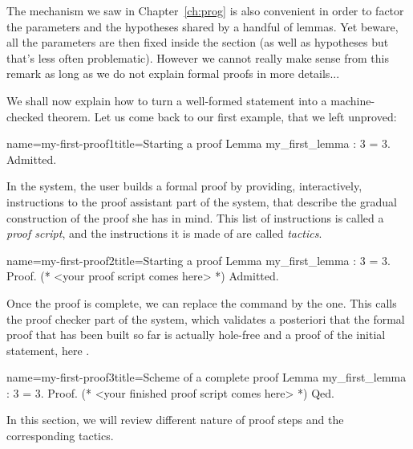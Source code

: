 
The  mechanism we saw in Chapter~\ref{ch:prog} is also
convenient in order to factor the parameters and the hypotheses shared
by a handful of lemmas. Yet beware, all the parameters are then fixed
inside the section (as well as hypotheses but that's less often
problematic). However we cannot really make sense from this remark as
long as we do not explain formal proofs in more details...


We shall now explain how to turn a well-formed statement into a
machine-checked theorem. Let us come back to our first example, that
we left unproved:
\begin{coq}{name=my-first-proof1}{title=Starting a proof}
Lemma my_first_lemma : 3 = 3.
Admitted.
\end{coq}
In the \Coq{} system, the user builds a formal proof by providing,
interactively, instructions to the proof assistant part of the \Coq{}
system, that describe the gradual construction of the proof she has in
mind. This list of instructions is called a \emph{proof script}, and
the instructions it is made of are called \emph{tactics}.

\begin{coq}{name=my-first-proof2}{title=Starting a proof}
Lemma my_first_lemma : 3 = 3.
Proof.
(* <your proof script comes here> *)
Admitted.
\end{coq}

Once the proof is complete, we can replace the  command by
the  one. This calls the proof checker part of  the \Coq{}
system, which validates a posteriori that the formal proof that has
been built so far is actually hole-free and a proof of the initial
statement, here .

\begin{coq}{name=my-first-proof3}{title=Scheme of a complete proof}
Lemma my_first_lemma : 3 = 3.
Proof.
(* <your finished proof script comes here> *)
Qed.
\end{coq}

In this section, we will review different nature of proof steps and
the corresponding tactics.

